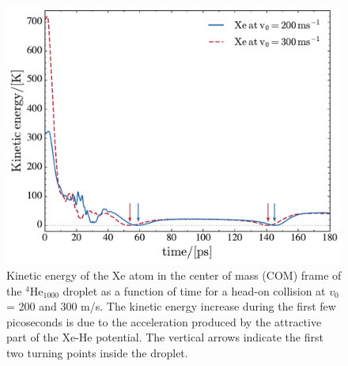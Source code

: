 \begin{figure}[!]
\centerline{\includegraphics[width=0.9\linewidth,clip]{kinetic-energy}}
\caption{\label{fig2-capture} 
Kinetic  energy  of the Xe atom in the center of mass (COM) frame of the $^4$He$_{1000}$ droplet 
as a function of time for  a head-on collision  at $v_0$= 200 and 300 m/s. The kinetic energy increase 
during the first few picoseconds is due to the
acceleration produced by the attractive part of the Xe-He potential. The vertical arrows indicate the first two turning points inside the droplet.
}
\end{figure}
%
